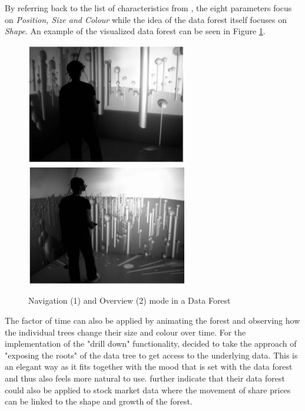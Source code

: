 By referring back to the list of characteristics from \cite{Stone1994}, the eight parameters focus on \textit{Position, Size and Colour} while the idea of the data forest itself focuses on \textit{Shape}. An example of the visualized data forest can be seen in Figure \ref{fig:dataforest}.
\begin{figure}[h]
	\begin{center}
		\includegraphics[width=7cm]{03_Figures/05_LitReview/Jamieson2007_DataTree.png}
		\includegraphics[width=7cm]{03_Figures/05_LitReview/Jamieson2007_DataTreeOverview.png}
		\caption[Navigation and Overview mode in a Data Forest]{Navigation (1) and Overview (2) mode in a Data Forest \citep{Jamieson2007}}
		\label{fig:dataforest}
	\end{center}
\end{figure}
The factor of time can also be applied by animating the forest and observing how the individual trees change their size and colour over time. For the implementation of the "drill down" functionality, \cite{Jamieson2007} decided to take the approach of "exposing the roots" of the data tree to get access to the underlying data. This is an elegant way as it fits together with the mood that is set with the data forest and thus also feels more natural to use. \newline
\cite{Jamieson2007} further indicate that their data forest could also be applied to stock market data where the movement of share prices can be linked to the shape and growth of the forest.


